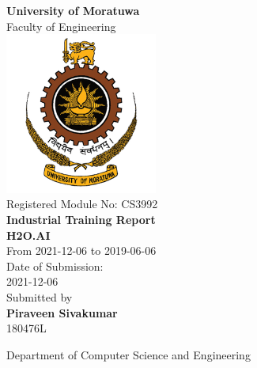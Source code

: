\begin{titlepage}

\begin{center}
\pagecolor{orange}\afterpage{\nopagecolor}




\Large \textup{{\bf University of Moratuwa} \\ Faculty of Engineering }\\[0.7in]


        
\includegraphics[width=50mm]{download.png}\\[0.2in]

\textup{Registered Module No: CS3992}\\[0.2in]

\textup{{\bf Industrial Training Report} }\\[0.2in]

\Large \textup{{\bf H2O.AI} }\\[0.2in]

\textup{From 2021-12-06 to 2019-06-06}\\[0.2in]

\textup{Date of Submission: \\ 2021-12-06}\\[0.2in]

\normalsize Submitted by \\[0.2in]
\textbf{Piraveen Sivakumar}\\
180476L\\


\vspace{.3in}


\Large{Department of Computer Science and Engineering}\\

\end{center}

\end{titlepage}
